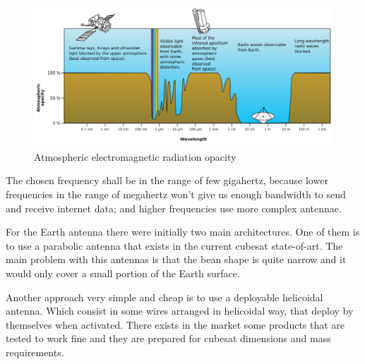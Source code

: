 \begin{figure}[h]
	\centering
	\includegraphics[width=\textwidth]{img/earth_freq.png}
	\caption{Atmospheric electromagnetic radiation opacity}
	\label{fig:frequency_atmosphere_opacity}
\end{figure}

The chosen frequency shall be in the range of few gigahertz, because lower
frequencies in the range of megahertz won't give us enough bandwidth to send and
receive internet data; and higher frequencies use more complex antennae.

For the Earth antenna there were initially two main architectures. One of them
is to use a parabolic antenna that exists in the current cubesat state-of-art.
The main problem with this antennas is that the bean shape is quite narrow and
it would only cover a small portion of the Earth surface.

Another approach very simple and cheap is to use a deployable helicoidal antenna.
Which consist in some wires arranged in helicoidal way, that deploy by themselves
when activated. There exists in the market some products that are tested to work
fine and they are prepared for cubesat dimensions and mass requirements.
